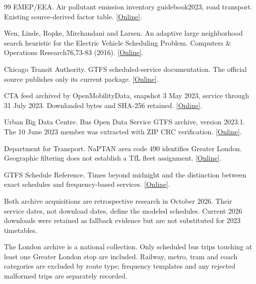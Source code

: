 \begin{thebibliography}{99}
 EMEP/EEA. Air pollutant emission inventory guidebook2023, road transport. Existing source-derived factor table. \href{https://www.eea.europa.eu/publications/emep-eea-guidebook-2023}{[Online]}.

 Wen, Linde, Ropke, Mirchandani and Larsen. An adaptive large neighborhood search heuristic for the Electric Vehicle Scheduling Problem. Computers \& Operations Research76,73-83 (2016). \href{https://doi.org/10.1016/j.cor.2016.06.013}{[Online]}.

 Chicago Transit Authority. GTFS scheduled-service documentation. The official source publishes only its current package. \href{https://www.transitchicago.com/developers/gtfs/}{[Online]}.

 CTA feed archived by OpenMobilityData, snapshot 3 May 2023, service through 31 July 2023. Downloaded bytes and SHA-256 retained. \href{https://openmobilitydata-data.s3.us-west-1.amazonaws.com/public/feeds/chicago-transit-authority/165/20230503/gtfs.zip}{[Online]}.

 Urban Big Data Centre. Bus Open Data Service GTFS archive, version 2023.1. The 10 June 2023 member was extracted with ZIP CRC verification. \href{https://zenodo.org/records/14779119}{[Online]}.

 Department for Transport. NaPTAN area code 490 identifies Greater London. Geographic filtering does not establish a TfL fleet assignment. \href{https://beta-naptan.dft.gov.uk/article/atco-codes-in-use}{[Online]}.

 GTFS Schedule Reference. Times beyond midnight and the distinction between exact schedules and frequency-based services. \href{https://gtfs.org/documentation/schedule/reference/}{[Online]}.

\end{thebibliography}

Both archive acquisitions are retrospective research in October 2026. Their service dates, not download dates, define the modeled schedules. Current 2026 downloads were retained as fallback evidence but are not substituted for 2023 timetables.

The London archive is a national collection. Only scheduled bus trips touching at least one Greater London stop are included. Railway, metro, tram and coach categories are excluded by route type; frequency templates and any rejected malformed trips are separately recorded.

\label{LastSolutionPage}
